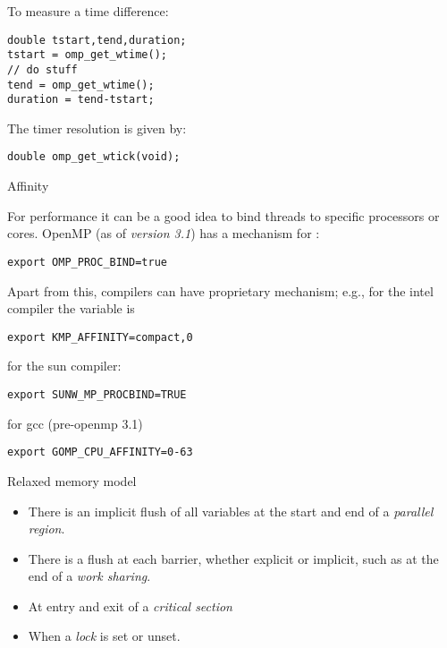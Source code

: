 To measure a time difference:
\begin{verbatim}
double tstart,tend,duration;
tstart = omp_get_wtime();
// do stuff
tend = omp_get_wtime();
duration = tend-tstart;
\end{verbatim}
The timer resolution is given by:
\begin{verbatim}
double omp_get_wtick(void);
\end{verbatim}

 {Affinity}

For performance it can be a good idea to bind threads to specific
processors or cores.  OpenMP (as of \emph{version 3.1}) has a
mechanism for :
\begin{verbatim}
export OMP_PROC_BIND=true  
\end{verbatim}
Apart from this, compilers can have proprietary mechanism; 
e.g., for the intel compiler the variable is
\begin{verbatim}
export KMP_AFFINITY=compact,0
\end{verbatim}
for the sun compiler:
\begin{verbatim}
export SUNW_MP_PROCBIND=TRUE
\end{verbatim}
for gcc (pre-openmp 3.1)
\begin{verbatim}
export GOMP_CPU_AFFINITY=0-63
\end{verbatim}

 {Relaxed memory model}


\begin{itemize}
\item There is an implicit flush of all variables at the start and end 
  of a \emph{parallel region}.
\item There is a flush at each barrier, whether explicit or implicit,
  such as at the end of a \emph{work sharing}.
\item At entry and exit of a \emph{critical section}
\item When a \emph{lock} is set or unset.
\end{itemize}

